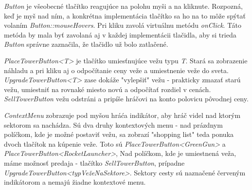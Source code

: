 \documentclass[12pt]{article}
\begin{document}
\emph{Button} je všeobecné tlačítko reagujúce na polohu myši a na kliknute. Rozpozná, keď je myš nad ním, a konkrétna implementácia
tlačítko sa ho na to môže spýtať volaním \emph{Button::mouseHovers}. Pri kliku zavolá virtuálnu metódu \emph{onClick}. Táto metóda by mala
byť zavolaná aj v každej implementácii tlačidla, aby si trieda \emph{Button} správne zaznačila, že tlačidlo už bolo zatlačené.


\emph{PlaceTowerButton<T>} je tlačítko umiesťnujúce vežu typu \emph{T}. Stará sa zobrazenie náhladu a pri kliku aj o odpočítanie ceny veže
a umiestnenie veže do sveta. \emph{UpgradeTowerButton<T>} zase dokáže "vylepšiť" vežu - prakticky zmazať starú vežu, umiestniť na rovnaké miesto
novú a odpočítať rozdiel v cenách. \emph{SellTowerButton} vežu odstráni a pripíše hráčovi na konto polovicu pôvodnej ceny.  


\emph{ContextMenu} zobrazuje pod myšou hráća indikátor, aby hráč videl nad ktorým sektorom sa nachádza.
Sú dva druhy kontextových menu - nad prázdnym políčkom, kde je možné postaviť vežu, sa zobrazí "shopping list"
teda ponuka dvoch tlačítok na kúpenie veže. Toto sú \emph{PlaceTowerButton<GreenGun>} a \emph{PlaceTowerButton<RocketLauncher>},
Nad políčkom, kde je umiestnená veža, máme možnosť predaja - tlačítko \emph{SellTowerButton}, prípadne \emph{UpgradeTowerButton<typVežeNaSektore>}.
Sektory cesty sú naznačené červeným indikátorom a nemajú žiadne kontextové menu.
\end{document}
